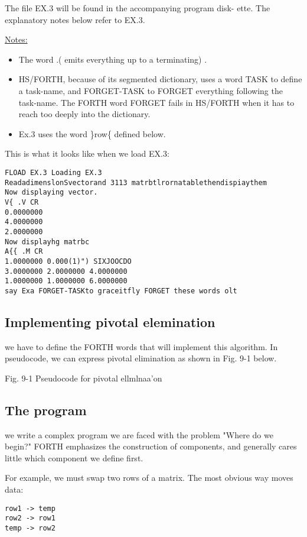 The file EX.3 will be found in the accompanying program disk-
ette. The explanatory notes below refer to EX.3.

\underline{Notes:}

\begin{itemize}
  \item The word .( emits everything up to a terminating) .
  \item HS/FORTH, because of its segmented dictionary, uses a word TASK to define a task-name, and FORGET-TASK to FORGET everything following the task-name. The FORTH word FORGET fails in HS/FORTH when it has to reach too deeply into the dictionary.
  \item Ex.3 uses the word \}row\{ defined below.
\end{itemize}

This is what it looks like when we load EX.3:

\begin{verbatim}
FLOAD EX.3 Loading EX.3
ReadadimenslonSvectorand 3113 matrbtlrornatablethendispiaythem
Now displaying vector.
V{ .V CR
0.0000000
4.0000000
2.0000000
Now displayhg matrbc
A{{ .M CR
1.0000000 0.000(1)") SIXJOOCDO
3.0000000 2.0000000 4.0000000
1.0000000 1.0000000 6.0000000
say Exa FORGET-TASKto graceitfly FORGET these words olt
\end{verbatim}

\subsection{Implementing pivotal elemination}
 we have to define the FORTH words that will implement
this algorithm. In pseudocode, we can express pivotal elimination as shown in Fig. 9-1 below.

 

Fig. 9-1 Pseudocode for pivotal ellmlnaa'on

\subsection{The program}
 we write a complex program we are faced with the
problem "Where do we begin?" FORTH emphasizes the construction of components,
and generally cares little which component
we define first.

For example, we must swap two rows of a matrix. The most
obvious way moves data:

\begin{verbatim}
row1 -> temp
row2 -> row1
temp -> row2
\end{verbatim}

